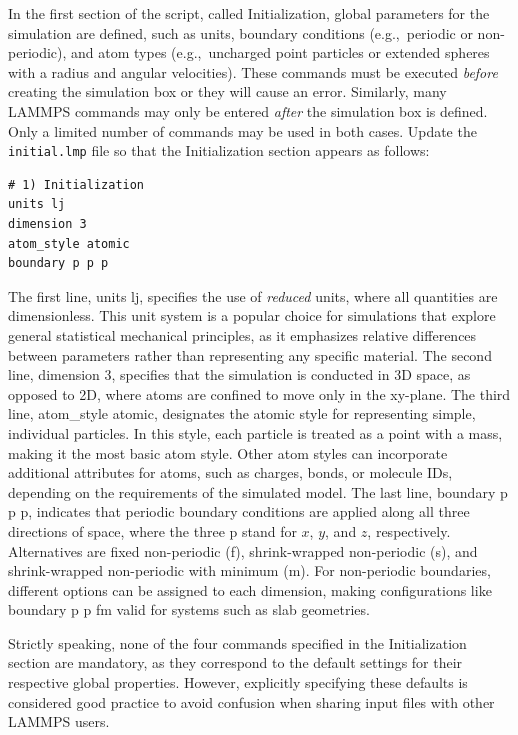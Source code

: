 \documentclass[9pt,tutorial]{livecoms}
\newcommand{\lmpcmd}[1]{\hspace{0pt}\colorbox{listing}{\textcolor{command}{\small{#1}}}\hspace{0pt}} %
\newcommand{\flecmd}[1]{\textcolor{command}{\texttt{#1}}} %
\begin{document}
In the first section of the script, called \lmpcmd{Initialization},
global parameters for the simulation are defined, such as units, boundary conditions
(e.g.,~periodic or non-periodic), and atom types (e.g.,~uncharged point particles
or extended spheres with a radius and angular velocities).  These commands must be
executed \emph{before} creating the simulation box or they will cause
an error.  Similarly, many LAMMPS commands may only be
entered \emph{after} the simulation box is defined.  Only a limited
number of commands may be used in both cases.  Update the \flecmd{initial.lmp} file
so that the \lmpcmd{Initialization} section appears as follows:
\begin{lstlisting}
# 1) Initialization
units lj
dimension 3
atom_style atomic
boundary p p p
\end{lstlisting}
The first line, \lmpcmd{units lj}, specifies the use of
\emph{reduced} units, where all quantities are dimensionless.  This unit system is
a popular choice for simulations that explore general statistical mechanical
principles, as it emphasizes relative differences between parameters rather than
representing any specific material.  The second line, \lmpcmd{dimension 3}, specifies that the simulation is conducted
in 3D space, as opposed to 2D, where atoms are confined to move only in the 
xy-plane.  The third line, \lmpcmd{atom\_style atomic}, designates
the atomic style for representing simple, individual particles.
In this style, each particle is treated as a point with a mass, making it the
most basic atom style.  Other atom styles can incorporate additional attributes for atoms,
such as charges, bonds, or molecule IDs, depending on the requirements of the simulated model.
The last line, \lmpcmd{boundary p p p}, indicates that periodic boundary
conditions are applied along all three directions of space, where the three
p stand for $x$, $y$, and $z$, respectively.  Alternatives are fixed non-periodic
(f), shrink-wrapped non-periodic (s), and shrink-wrapped non-periodic
with minimum (m).  For non-periodic boundaries, different options
can be assigned to each dimension, making configurations like \lmpcmd{boundary p p fm}
valid for systems such as slab geometries.

\begin{note}
Strictly speaking, none of the four commands specified in the
Initialization section are mandatory, as
they correspond to the default settings for their respective global properties.
However, explicitly specifying these defaults is considered good practice
to avoid confusion when sharing input files with other LAMMPS users.
\end{note}
\end{document}
